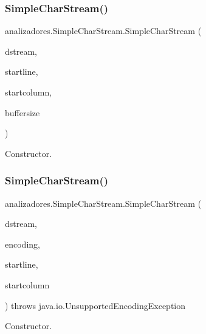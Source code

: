 \subsubsection{\texorpdfstring{Simple\+Char\+Stream()}{SimpleCharStream()}\hspace{0.1cm}{\footnotesize\ttfamily [5/9]}}
{\footnotesize\ttfamily analizadores.\+Simple\+Char\+Stream.\+Simple\+Char\+Stream (\begin{DoxyParamCaption}\item[{java.\+io.\+Input\+Stream}]{dstream,  }\item[{int}]{startline,  }\item[{int}]{startcolumn,  }\item[{int}]{buffersize }\end{DoxyParamCaption})}

Constructor. \mbox{\label{classanalizadores_1_1_simple_char_stream_a277db3968e8f2b76a24f6d90ea9942d9}} 
\subsubsection{\texorpdfstring{Simple\+Char\+Stream()}{SimpleCharStream()}\hspace{0.1cm}{\footnotesize\ttfamily [6/9]}}
{\footnotesize\ttfamily analizadores.\+Simple\+Char\+Stream.\+Simple\+Char\+Stream (\begin{DoxyParamCaption}\item[{java.\+io.\+Input\+Stream}]{dstream,  }\item[{String}]{encoding,  }\item[{int}]{startline,  }\item[{int}]{startcolumn }\end{DoxyParamCaption}) throws java.\+io.\+Unsupported\+Encoding\+Exception}

Constructor. \mbox{\label{classanalizadores_1_1_simple_char_stream_a7ffee5e3a468a82be8d5b35933bd9ab0}} 
